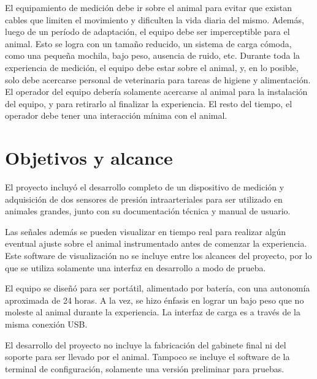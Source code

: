 El equipamiento de medición debe ir sobre el animal para evitar que existan cables que limiten el movimiento y dificulten la vida diaria del mismo. Además, luego de un período de adaptación, el equipo debe ser imperceptible para el animal. Esto se logra con un tamaño reducido, un sistema de carga cómoda, como una pequeña mochila, bajo peso, ausencia de ruido, etc. Durante toda la experiencia de medición, el equipo debe estar sobre el animal, y, en lo posible, solo debe acercarse personal de veterinaria para tareas de higiene y alimentación. El operador del equipo debería solamente acercarse al animal para la instalación del equipo, y para retirarlo al finalizar la experiencia. El resto del tiempo, el operador debe tener una interacción mínima con el animal.


\section{Objetivos y alcance}

El proyecto incluyó el desarrollo completo de un dispositivo de medición y adquisición de dos sensores de presión intraarteriales para ser utilizado en animales grandes, junto con su documentación técnica y manual de usuario. 

Las señales además se pueden visualizar en tiempo real para realizar algún eventual ajuste sobre el animal instrumentado antes de comenzar la experiencia. Este software de visualización no se incluye entre los alcances del proyecto, por lo que se utiliza solamente una interfaz en desarrollo a modo de prueba. 

El equipo se diseñó para ser portátil, alimentado por batería, con una autonomía aproximada de 24 horas. A la vez, se hizo énfasis en lograr un bajo peso que no moleste al animal durante la experiencia. La interfaz de carga es a través de la misma conexión USB.

El desarrollo del proyecto no incluye la fabricación del gabinete final ni del soporte para ser llevado por el animal. Tampoco se incluye el software de la terminal de configuración, solamente una versión preliminar para pruebas.

